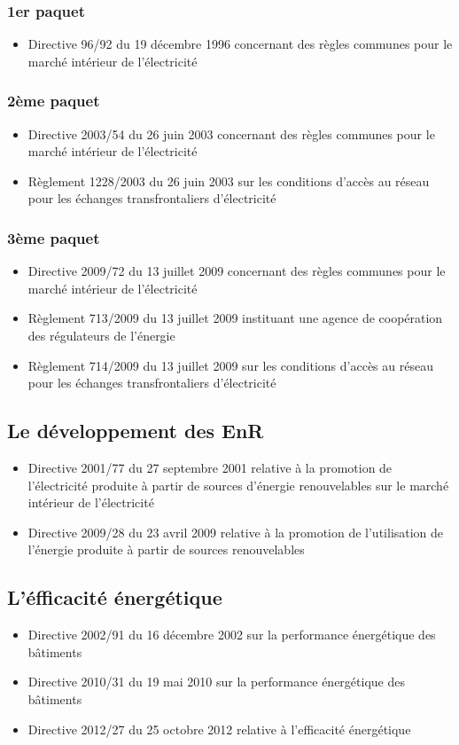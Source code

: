 \subsubsection{1er paquet}
\begin{itemize}
    \item Directive 96/92 du 19 décembre 1996 concernant des règles communes pour le marché intérieur de l’électricité
\end{itemize}
\subsubsection{2ème paquet}
\begin{itemize}
    \item Directive 2003/54 du 26 juin 2003 concernant des règles communes pour le marché intérieur de l’électricité
    \item Règlement 1228/2003 du 26 juin 2003 sur les conditions d’accès au réseau pour les échanges transfrontaliers d’électricité
\end{itemize}
\subsubsection{3ème paquet}
\begin{itemize}
    \item Directive 2009/72 du 13 juillet 2009 concernant des règles communes pour le marché intérieur de l’électricité
    \item Règlement 713/2009 du 13 juillet 2009 instituant une agence de coopération des régulateurs de l’énergie
    \item Règlement 714/2009 du 13 juillet 2009 sur les conditions d’accès au réseau pour les échanges transfrontaliers d’électricité
\end{itemize}
\newpage
\subsection{Le développement des EnR}
\begin{itemize}
    \item Directive 2001/77 du 27 septembre 2001 relative à la promotion de l’électricité produite à partir de sources d’énergie renouvelables sur le marché intérieur de l’électricité
    \item Directive 2009/28 du 23 avril 2009 relative à la promotion de l’utilisation de l’énergie produite à partir de sources renouvelables 
\end{itemize}
\subsection{L'éfficacité énergétique}
\begin{itemize}
    \item Directive 2002/91 du 16 décembre 2002 sur la performance énergétique des bâtiments
    \item Directive 2010/31 du 19 mai 2010 sur la performance énergétique des bâtiments
    \item Directive 2012/27 du 25 octobre 2012 relative à l’efficacité énergétique
\end{itemize}
